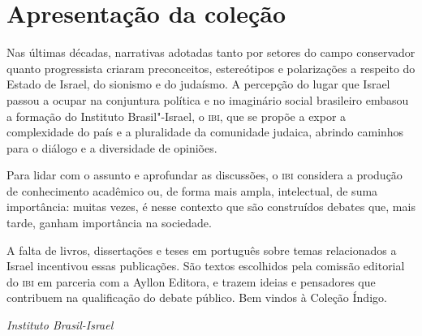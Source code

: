 \chapter{Apresentação da coleção}

Nas últimas décadas, narrativas adotadas tanto por setores do campo conservador quanto progressista criaram preconceitos, estereótipos e polarizações a respeito do Estado de Israel, do sionismo e do judaísmo. A percepção do lugar que Israel passou a ocupar na conjuntura política e no imaginário social brasileiro embasou a formação do Instituto Brasil"-Israel, o \textsc{ibi}, que se propõe a expor a complexidade do país e a pluralidade da comunidade judaica, abrindo caminhos para o diálogo e a diversidade de opiniões.

Para lidar com o assunto e aprofundar as discussões, o \textsc{ibi} considera a produção de conhecimento acadêmico ou, de forma mais ampla, intelectual, de suma importância: muitas vezes, é nesse contexto que são construídos debates que, mais tarde, ganham importância na sociedade.

A falta de livros, dissertações e teses em português sobre temas relacionados a Israel incentivou essas publicações. São textos escolhidos pela comissão editorial do \textsc{ibi} em parceria com a Ayllon Editora, e trazem ideias e pensadores que contribuem na qualificação do debate público. Bem vindos à Coleção Índigo.

\bigskip

\hfill\emph{Instituto Brasil-Israel}